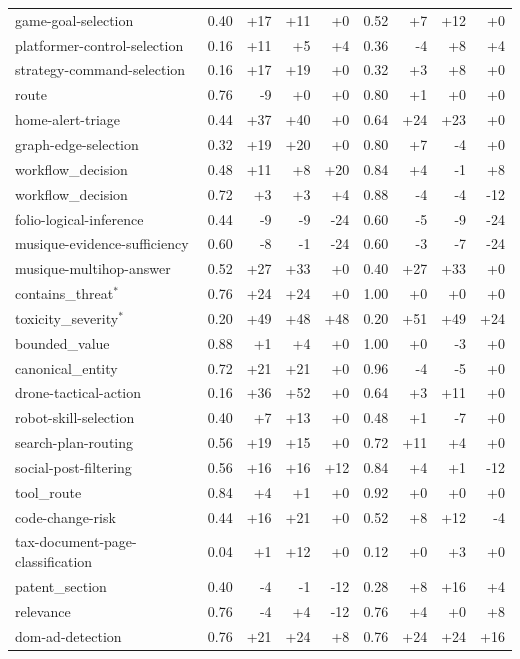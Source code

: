 \begin{table}[tbp]
\begin{tabular}{lrrrrrrrr}
game-goal-selection & 0.40 & +17 & +11 & +0 & 0.52 & +7 & +12 & +0 \\
platformer-control-selection & 0.16 & +11 & +5 & +4 & 0.36 & -4 & +8 & +4 \\
strategy-command-selection & 0.16 & +17 & +19 & +0 & 0.32 & +3 & +8 & +0 \\
route & 0.76 & -9 & +0 & +0 & 0.80 & +1 & +0 & +0 \\
home-alert-triage & 0.44 & +37 & +40 & +0 & 0.64 & +24 & +23 & +0 \\
graph-edge-selection & 0.32 & +19 & +20 & +0 & 0.80 & +7 & -4 & +0 \\
workflow\_decision & 0.48 & +11 & +8 & +20 & 0.84 & +4 & -1 & +8 \\
workflow\_decision & 0.72 & +3 & +3 & +4 & 0.88 & -4 & -4 & -12 \\
folio-logical-inference & 0.44 & -9 & -9 & -24 & 0.60 & -5 & -9 & -24 \\
musique-evidence-sufficiency & 0.60 & -8 & -1 & -24 & 0.60 & -3 & -7 & -24 \\
musique-multihop-answer & 0.52 & +27 & +33 & +0 & 0.40 & +27 & +33 & +0 \\
contains\_threat$^*$ & 0.76 & +24 & +24 & +0 & 1.00 & +0 & +0 & +0 \\
toxicity\_severity$^*$ & 0.20 & +49 & +48 & +48 & 0.20 & +51 & +49 & +24 \\
bounded\_value & 0.88 & +1 & +4 & +0 & 1.00 & +0 & -3 & +0 \\
canonical\_entity & 0.72 & +21 & +21 & +0 & 0.96 & -4 & -5 & +0 \\
drone-tactical-action & 0.16 & +36 & +52 & +0 & 0.64 & +3 & +11 & +0 \\
robot-skill-selection & 0.40 & +7 & +13 & +0 & 0.48 & +1 & -7 & +0 \\
search-plan-routing & 0.56 & +19 & +15 & +0 & 0.72 & +11 & +4 & +0 \\
social-post-filtering & 0.56 & +16 & +16 & +12 & 0.84 & +4 & +1 & -12 \\
tool\_route & 0.84 & +4 & +1 & +0 & 0.92 & +0 & +0 & +0 \\
code-change-risk & 0.44 & +16 & +21 & +0 & 0.52 & +8 & +12 & -4 \\
tax-document-page-classification & 0.04 & +1 & +12 & +0 & 0.12 & +0 & +3 & +0 \\
patent\_section & 0.40 & -4 & -1 & -12 & 0.28 & +8 & +16 & +4 \\
relevance & 0.76 & -4 & +4 & -12 & 0.76 & +4 & +0 & +8 \\
dom-ad-detection & 0.76 & +21 & +24 & +8 & 0.76 & +24 & +24 & +16 \\
\bottomrule
\end{tabular}
\end{table}
